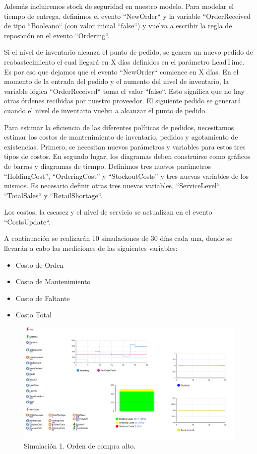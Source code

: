 Además incluiremos stock de seguridad en nuestro modelo.
Para modelar el tiempo de entrega, definimos el evento ``NewOrder`` y la variable ``OrderReceived de tipo ``Booleano`` (con valor inicial ``false``) y vuelva a escribir la regla de reposición en el evento ``Ordering``.

Si el nivel de inventario alcanza el punto de pedido, se genera un nuevo pedido de reabastecimiento el cual llegará en X días definidos en el parámetro LeadTime.
Es por eso que dejamos que el evento ``NewOrder`` comience en X días.
En el momento de la entrada del pedido y el aumento del nivel de inventario, la variable lógica ``OrderReceived`` toma el valor ``false``. Esto significa que no hay otras órdenes
recibidas por nuestro proveedor.
El siguiente pedido se generará cuando el nivel de inventario vuelva a alcanzar el punto de pedido.

Para estimar la eficiencia de las diferentes políticas de pedidos, necesitamos estimar los costos de mantenimiento de inventario, pedidos y agotamiento de existencias.
Primero, se necesitan nuevos parámetros y variables para estos tres tipos de costos. En segundo lugar, los diagramas deben construirse como gráficos de barras y diagramas de tiempo.
Definimos tres nuevos parámetros “HoldingCost”, “OrderingCost” y “StockoutCosts” y tres nuevas variables de los mismos. Es necesario definir otras tres nuevas variables, ``ServiceLevel``, ``TotalSales`` y ``RetailShortage``.

Los costos, la escasez y el nivel de servicio se actualizan en el evento ``CostsUpdate``.

A continuación se realizarán 10 simulaciones de 30 días cada una, donde se llevarán a cabo las mediciones de las siguientes variables:
\begin{itemize}
    \item Costo de Orden
    \item Costo de Mantenimiento
    \item Costo de Faltante
    \item Costo Total
\end{itemize}

\begin{figure}[H]
    \includegraphics[width=\linewidth]{images/img1invent}
    \caption{Simulación 1. Orden de compra alto.}
\end{figure}


